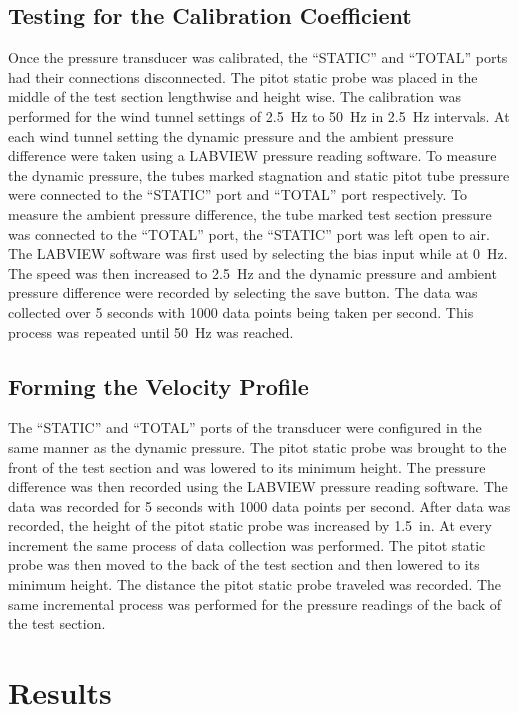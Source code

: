 \documentclass[journal,letterpaper]{IEEEtran}
\begin{document}
\subsection{Testing for the Calibration Coefficient}

Once the pressure transducer was calibrated, the “STATIC” and “TOTAL” ports had their connections disconnected.
The pitot static probe was placed in the middle of the test section lengthwise and height wise.
The calibration was performed for the wind tunnel settings of \qty{2.5}{\hertz} to \qty{50}{\hertz} in \qty{2.5}{\hertz} intervals.
At each wind tunnel setting the dynamic pressure and the ambient pressure difference were taken using a LABVIEW pressure reading software.
To measure the dynamic pressure, the tubes marked stagnation and static pitot tube pressure were connected to the “STATIC” port and “TOTAL” port respectively.
To measure the ambient pressure difference, the tube marked test section pressure was connected to the “TOTAL” port, the “STATIC” port was left open to air.
The LABVIEW software was first used by selecting the bias input while at \qty{0}{\hertz}.
The speed was then increased to \qty{2.5}{\hertz} and the dynamic pressure and ambient pressure difference were recorded by selecting the save button.
The data was collected over 5 seconds with 1000 data points being taken per second.
This process was repeated until \qty{50}{\hertz} was reached.


\subsection{Forming the Velocity Profile}

The “STATIC” and “TOTAL” ports of the transducer were configured in the same manner as the dynamic pressure.
The pitot static probe was brought to the front of the test section and was lowered to its minimum height.
The pressure difference was then recorded using the LABVIEW pressure reading software.
The data was recorded for 5 seconds with 1000 data points per second.
After data was recorded, the height of the pitot static probe was increased by \qty{1.5}{in}.
At every increment the same process of data collection was performed.
The pitot static probe was then moved to the back of the test section and then lowered to its minimum height.
The distance the pitot static probe traveled was recorded.
The same incremental process was performed for the pressure readings of the back of the test section.


\section{Results}
\end{document}
